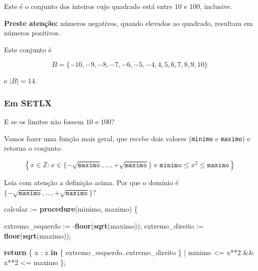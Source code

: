 \documentclass[
  letterpaper,
  DIV=11,
  numbers=noendperiod]{scrreprt}
\newenvironment{Shaded}{\begin{snugshade}}{\end{snugshade}}
\newcommand{\DecValTok}[1]{\textcolor[rgb]{0.00,0.00,0.81}{#1}}
\newcommand{\KeywordTok}[1]{\textcolor[rgb]{0.13,0.29,0.53}{\textbf{#1}}}
\newcommand{\NormalTok}[1]{#1}
\begin{document}
\begin{tcolorbox}[enhanced jigsaw, left=2mm, titlerule=0mm, colbacktitle=quarto-callout-important-color!10!white, title={Resposta (b)}, arc=.35mm, opacityback=0, bottomrule=.15mm, breakable, toprule=.15mm, colback=white, coltitle=black, bottomtitle=1mm, rightrule=.15mm, toptitle=1mm, leftrule=.75mm, colframe=quarto-callout-important-color-frame, opacitybacktitle=0.6]

Este é o conjunto dos inteiros cujo quadrado está entre $10$ e $100$,
inclusive.

\textbf{Preste atenção:} números negativos, quando elevados ao quadrado,
resultam em números positivos.

Este conjunto é

\[
B = \{ -10, -9, -8, -7, -6, -5, -4, 4, 5, 6, 7, 8, 9, 10 \}
\]

e $|B| = 14$.

\subsubsection*{Em SETLX}\label{em-setlx-3}

E se os limites não fossem $10$ e $100$?

Vamos fazer uma função mais geral, que recebe dois valores
(\texttt{minimo} e \texttt{maximo}) e retorna o conjunto

\[
\left\{ 
x \in \mathbb{Z}: 
x \in \{ -\sqrt{\texttt{maximo}}, \ldots, +\sqrt{\texttt{maximo}} \}
\text{ e } \texttt{minimo} \leq x^2 \leq \texttt{maximo}
\right\}
\]

Leia com atenção a definição acima. Por que o domínio é
$\{ -\sqrt{\texttt{maximo}}, \ldots, +\sqrt{\texttt{maximo}} \}$?

\begin{Shaded}
\begin{Highlighting}[]
\NormalTok{calcular := }\KeywordTok{procedure}\NormalTok{(minimo, maximo) \{}
  
\NormalTok{  extremo\_esquerdo := {-}}\KeywordTok{floor}\NormalTok{(}\KeywordTok{sqrt}\NormalTok{(maximo));}
\NormalTok{  extremo\_direito  :=  }\KeywordTok{floor}\NormalTok{(}\KeywordTok{sqrt}\NormalTok{(maximo));}
  
  \KeywordTok{return}\NormalTok{ \{ }
\NormalTok{    x : }
\NormalTok{      x }\KeywordTok{in}\NormalTok{ \{ extremo\_esquerdo..extremo\_direito \} |}
\NormalTok{        minimo \textless{}= x**}\DecValTok{2}\NormalTok{ \&\& x**}\DecValTok{2}\NormalTok{ \textless{}= maximo}
\NormalTok{  \};}
  

\end{Highlighting}
\end{Shaded}
\end{tcolorbox}
\end{document}
